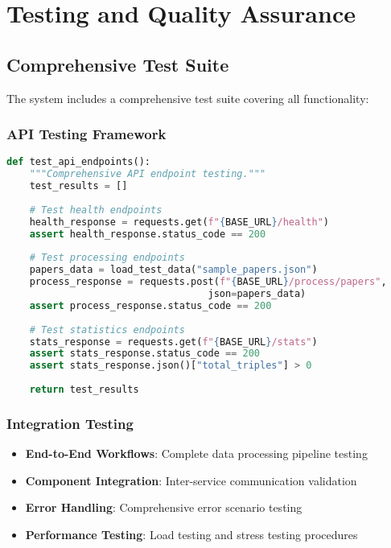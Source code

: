 \documentclass[12pt,a4paper]{article}
\begin{document}
\section{Testing and Quality Assurance}

\subsection{Comprehensive Test Suite}

The system includes a comprehensive test suite covering all functionality:

\subsubsection{API Testing Framework}

\begin{lstlisting}[language=python,caption=API Test Suite Structure]
def test_api_endpoints():
    """Comprehensive API endpoint testing."""
    test_results = []
    
    # Test health endpoints
    health_response = requests.get(f"{BASE_URL}/health")
    assert health_response.status_code == 200
    
    # Test processing endpoints
    papers_data = load_test_data("sample_papers.json")
    process_response = requests.post(f"{BASE_URL}/process/papers", 
                                   json=papers_data)
    assert process_response.status_code == 200
    
    # Test statistics endpoints
    stats_response = requests.get(f"{BASE_URL}/stats")
    assert stats_response.status_code == 200
    assert stats_response.json()["total_triples"] > 0
    
    return test_results
\end{lstlisting}

\subsubsection{Integration Testing}

\begin{itemize}
    \item \textbf{End-to-End Workflows}: Complete data processing pipeline testing
    \item \textbf{Component Integration}: Inter-service communication validation
    \item \textbf{Error Handling}: Comprehensive error scenario testing
    \item \textbf{Performance Testing}: Load testing and stress testing procedures
\end{itemize}
\end{document}
